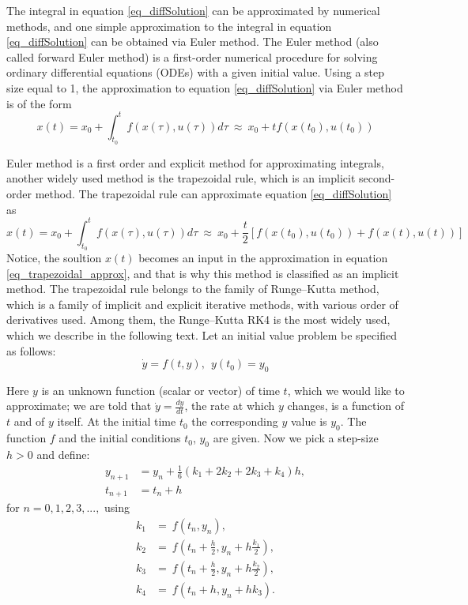 \documentclass  [
  paper    = a4,
  BCOR     = 10mm,
  twoside,
  fontsize = 12pt,
  fleqn,
  toc      = bibnumbered,
  toc      = listofnumbered,
  numbers  = noendperiod,
  headings = normal,
  listof   = leveldown,
  version  = 3.03
]                                       {scrreprt}
\newcommand{\<}{\langle}
\renewcommand{\>}{\rangle}
\begin{document}
The integral in equation \ref{eq_diffSolution} can be approximated by numerical methods, and one simple approximation to the integral in equation \ref{eq_diffSolution} can be obtained via Euler method. The Euler method (also called forward Euler method) is a first-order numerical procedure for solving ordinary differential equations (ODEs) with a given initial value. Using a step size equal to 1, the approximation to equation \ref{eq_diffSolution} via Euler method is of the form
\begin{equation}
	x(t)  = x_0  + \int_{t_0}^{t}  f(x(\tau), u(\tau)) d \tau \ \approx \   x_0  + t f(x(t_0), u(t_0))
	\label{eq_Euler_approx}
\end{equation}

Euler method is a first order and explicit method for approximating integrals, another widely used method is the trapezoidal rule, which is an implicit second-order method. The trapezoidal rule can approximate equation \ref{eq_diffSolution} as 
\begin{equation}
	x(t)  = x_0  + \int_{t_0}^{t}  f(x(\tau), u(\tau)) d \tau \ \approx \   x_0  + \frac{t}{2}[f(x(t_0), u(t_0)) + f(x(t), u(t))]  
	\label{eq_trapezoidal_approx}
\end{equation}
Notice, the soultion $x(t)$ becomes an input in the approximation in equation \ref{eq_trapezoidal_approx}, and that is why this method is classified as an implicit method. The trapezoidal rule belongs to the family of Runge–Kutta method, which is a family of implicit and explicit iterative methods, with various order of derivatives used. Among them, the Runge–Kutta  RK4 is the most widely used, which we describe in the following text. Let an initial value problem be specified as follows:
\begin{equation}\label{eqn:RK4_diff}
 \dot{y} = f(t, y) , \ \  y(t_0) = y_0  
\end{equation}

Here $y$ is an unknown function (scalar or vector) of time $t$, which we would like to approximate; we are told that $\dot{y} = \frac{dy}{dt}$, the rate at which $y$ changes, is a function of $t$ and of $y$ itself. At the initial time $t_0$ the corresponding $y$ value is $y_0$. The function $f$ and the initial conditions $t_0$, $y_0$ are given. Now we pick a step-size $h>0$ and define:
\begin{align}
	y_{n+1} &= y_n + \frac{1}{6}\left(k_1 + 2k_2 + 2k_3 + k_4 \right)h,\\
	t_{n+1} &= t_n + h
\end{align}
for $n = 0, 1, 2, 3, ...,$ using
\begin{align}
	k_1 &= \ f(t_n, y_n), \\
	k_2 &= \ f\!\left(t_n + \frac{h}{2}, y_n + h\frac{k_1}{2}\right), \\ 
	k_3 &= \ f\!\left(t_n + \frac{h}{2}, y_n + h\frac{k_2}{2}\right), \\
	k_4 &= \ f\!\left(t_n + h, y_n + hk_3\right).
\end{align}
\end{document}
